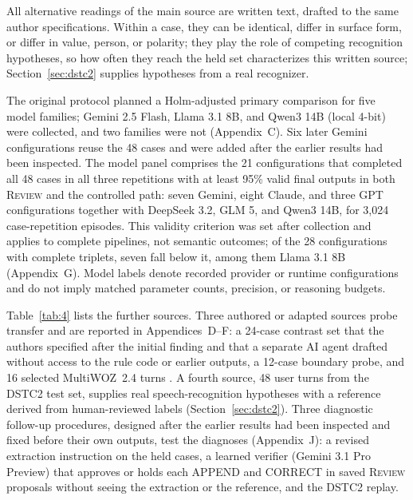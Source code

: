 \documentclass[acmsmall,review]{acmart}
\newcommand{\review}{\textsc{Review}}
\begin{document}
All alternative readings of the main source are written text, drafted to the same author specifications. Within a case, they can be identical, differ in surface form, or differ in value, person, or polarity; they play the role of competing recognition hypotheses, so how often they reach the held set characterizes this written source; Section~\ref{sec:dstc2} supplies hypotheses from a real recognizer.

The original protocol planned a Holm-adjusted primary comparison for five model families; Gemini 2.5 Flash, Llama 3.1 8B, and Qwen3 14B (local 4-bit) were collected, and two families were not (Appendix~C). Six later Gemini configurations reuse the 48 cases and were added after the earlier results had been inspected. The model panel comprises the 21 configurations that completed all 48 cases in all three repetitions with at least 95\% valid final outputs in both \review{} and the controlled path: seven Gemini, eight Claude, and three GPT configurations together with DeepSeek 3.2, GLM 5, and Qwen3 14B, for 3,024 case-repetition episodes. This validity criterion was set after collection and applies to complete pipelines, not semantic outcomes; of the 28 configurations with complete triplets, seven fall below it, among them Llama 3.1 8B (Appendix~G). Model labels denote recorded provider or runtime configurations and do not imply matched parameter counts, precision, or reasoning budgets.

Table~\ref{tab:4} lists the further sources. Three authored or adapted sources probe transfer and are reported in Appendices~D--F: a 24-case contrast set that the authors specified after the initial finding and that a separate AI agent drafted without access to the rule code or earlier outputs, a 12-case boundary probe, and 16 selected MultiWOZ~2.4 turns \cite{cite42}. A fourth source, 48 user turns from the DSTC2 test set, supplies real speech-recognition hypotheses with a reference derived from human-reviewed labels (Section~\ref{sec:dstc2}). Three diagnostic follow-up procedures, designed after the earlier results had been inspected and fixed before their own outputs, test the diagnoses (Appendix~J): a revised extraction instruction on the held cases, a learned verifier (Gemini 3.1 Pro Preview) that approves or holds each APPEND and CORRECT in saved \review{} proposals without seeing the extraction or the reference, and the DSTC2 replay.
\end{document}
